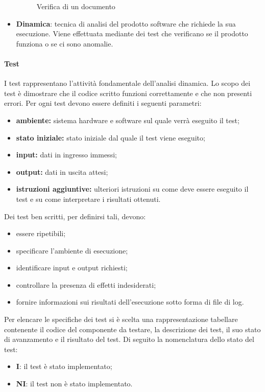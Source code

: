 \begin{itemize}
\begin{figure}[H]
	\caption{Verifica di un documento}
	\label{fig:Verifica di un documento}
\end{figure}
			\item \textbf{Dinamica}: tecnica di analisi del prodotto software che richiede la sua esecuzione. Viene effettuata mediante dei test che verificano se il prodotto funziona o se ci sono anomalie.
			\end{itemize}
			\paragraph{Test}
			I test rappresentano l'attività fondamentale dell'analisi dinamica. Lo scopo dei test è dimostrare che il codice scritto funzioni correttamente e che non presenti errori. 
			Per ogni test devono essere definiti i seguenti parametri: 
			\begin{itemize}
			\item \textbf{ambiente:} sistema hardware e software sul quale verrà eseguito il test;
			\item \textbf{stato iniziale:} stato iniziale dal quale il test viene eseguito;
			\item \textbf{input:} dati in ingresso immessi;
			\item \textbf{output:} dati in uscita attesi;
			\item \textbf{istruzioni aggiuntive:} ulteriori istruzioni su come deve essere eseguito il test e su come interpretare i risultati ottenuti.
			\end{itemize}
			Dei test ben scritti, per definirsi tali, devono:
			\begin{itemize}
			\item essere ripetibili;
			\item specificare l'ambiente di esecuzione;
			\item identificare input e output richiesti;
			\item controllare la presenza di effetti indesiderati;
			\item fornire informazioni sui risultati dell’esecuzione sotto forma di file di log.
			\end{itemize}
			Per elencare le specifiche dei test si è scelta una rappresentazione tabellare contenente il codice del componente da testare, la descrizione dei test, il suo stato di avanzamento e il risultato del test.
			Di seguito la nomenclatura dello stato del test:
			\begin{itemize}
				\item \textbf{I}: il test è stato implementato;
				\item \textbf{NI}: il test non è stato implementato.
			\end{itemize}			
